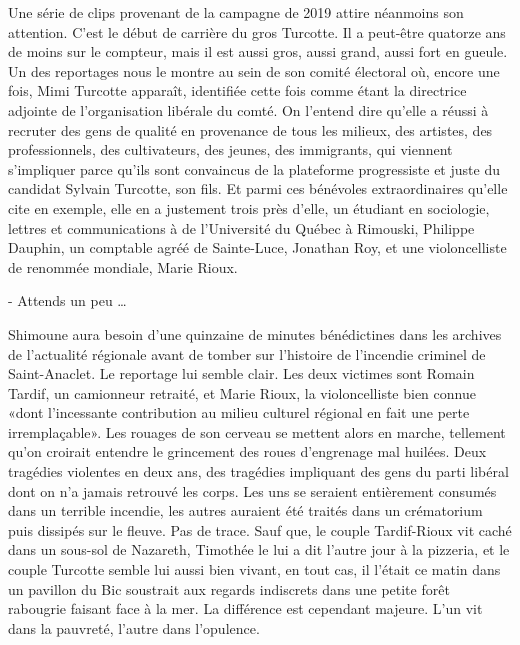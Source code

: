 Une série de clips provenant de la campagne de 2019 attire néanmoins son attention. C’est le début de carrière du gros Turcotte. Il a peut-être quatorze ans de moins sur le compteur, mais il est aussi gros, aussi grand, aussi fort en gueule. Un des reportages nous le montre au sein de son comité électoral où, encore une fois, Mimi Turcotte apparaît, identifiée cette fois comme étant la directrice adjointe de l’organisation libérale du comté. On l’entend dire qu’elle a réussi à recruter des gens de qualité en provenance de tous les milieux, des artistes, des professionnels, des cultivateurs, des jeunes, des immigrants, qui viennent s’impliquer parce qu’ils sont convaincus de la plateforme progressiste et juste du candidat Sylvain Turcotte, son fils. Et parmi ces bénévoles extraordinaires qu’elle cite en exemple, elle en a justement trois près d’elle, un étudiant en sociologie, lettres et communications à de l’Université du Québec à Rimouski, Philippe Dauphin, un comptable agréé de Sainte-Luce, Jonathan Roy, et une violoncelliste de renommée mondiale, Marie Rioux.

- Attends un peu …

Shimoune aura besoin d’une quinzaine de minutes bénédictines dans les archives de l’actualité régionale avant de tomber sur l’histoire de l’incendie criminel de Saint-Anaclet. Le reportage lui semble clair. Les deux victimes sont Romain Tardif, un camionneur retraité, et Marie Rioux, la violoncelliste bien connue «dont l’incessante contribution au milieu culturel régional en fait une perte irremplaçable». Les rouages de son cerveau se mettent alors en marche, tellement qu’on croirait entendre le grincement des roues d’engrenage mal huilées. Deux tragédies violentes en deux ans, des tragédies impliquant des gens du parti libéral dont on n’a jamais retrouvé les corps. Les uns se seraient entièrement consumés dans un terrible incendie, les autres auraient été traités dans un crématorium puis dissipés sur le fleuve. Pas de trace. Sauf que, le couple Tardif-Rioux vit caché dans un sous-sol de Nazareth, Timothée le lui a dit l’autre jour à la pizzeria, et le couple Turcotte semble lui aussi bien vivant, en tout cas, il l’était ce matin dans un pavillon du Bic soustrait aux regards indiscrets dans une petite forêt rabougrie faisant face à la mer. La différence est cependant majeure. L’un vit dans la pauvreté, l’autre dans l’opulence.


